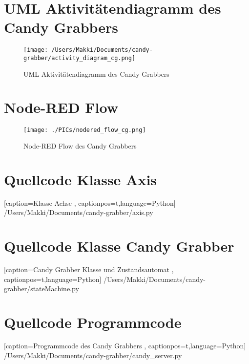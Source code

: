 \documentclass[BMR,Bachelor,ngerman]{twbook}%
\begin{document}
\chapter{UML Aktivitätendiagramm des Candy Grabbers}
\begin{figure}[H]
\centering
\texttt{[image: /Users/Makki/Documents/candy-grabber/activity\_diagram\_cg.png]}
\caption{UML Aktivitätendiagramm des Candy Grabbers}\label{fig:uml_activity}
\end{figure}
%
\chapter{Node-RED Flow}
\begin{figure}[H]
\centering
\texttt{[image: ./PICs/nodered\_flow\_cg.png]}
\caption{Node-RED Flow des Candy Grabbers}\label{fig:nodered_flow}
\end{figure}
%
%
\chapter{Quellcode Klasse Axis}
 
    [caption={Klasse Achse}
       \label{lst:axis},
       captionpos=t,language=Python]
 {/Users/Makki/Documents/candy-grabber/axis.py}
\clearpage
\chapter{Quellcode Klasse Candy Grabber}
 
    [caption={Candy Grabber Klasse und Zustandsautomat}
       \label{lst:stateMachine},
       captionpos=t,language=Python]
 {/Users/Makki/Documents/candy-grabber/stateMachine.py}
%
\clearpage
\chapter{Quellcode Programmcode}
 
    [caption={Programmcode des Candy Grabbers}
       \label{lst:candy_server},
       captionpos=t,language=Python]
 {/Users/Makki/Documents/candy-grabber/candy_server.py}
\end{document}
